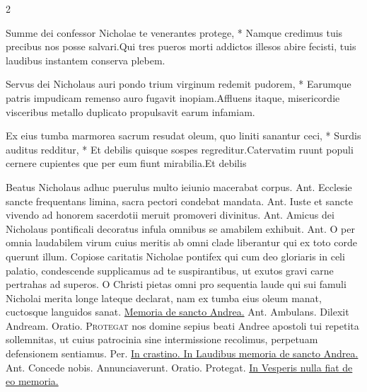 \begin{multicols*}{2}
\begin{responsory}
{Summe dei confessor Nicholae te venerantes protege, * Namque credimus tuis precibus nos posse salvari.}{Qui tres pueros morti addictos illesos abire fecisti, tuis laudibus instantem conserva plebem.}
\end{responsory}%
\begin{responsory}
{Servus dei Nicholaus auri pondo trium virginum redemit pudorem, * Earumque patris impudicam remenso auro fugavit inopiam.}{Affluens itaque, misericordie visceribus metallo duplicato propulsavit earum infamiam.}
\end{responsory}%
\begin{responsory-final}
{Ex eius tumba marmorea sacrum resudat oleum, quo liniti sanantur ceci, * Surdis auditus redditur, * Et debilis quisque sospes regreditur.}{Catervatim ruunt populi cernere cupientes que per eum fiunt mirabilia.}{Et debilis}%
\end{responsory-final}%
 Beatus Nicholaus adhuc puerulus multo ieiunio macerabat corpus. {\color{Red} Ant.} Ecclesie sancte frequentans limina, sacra pectori condebat mandata. {\color{Red} Ant.} Iuste et sancte vivendo ad honorem sacerdotii meruit promoveri divinitus. {\color{Red} Ant.} Amicus dei Nicholaus pontificali decoratus infula omnibus se amabilem exhibuit. {\color{Red} Ant.} O per omnia laudabilem virum cuius meritis ab omni clade liberantur qui ex toto corde querunt illum.
 Copiose caritatis Nicholae pontifex qui cum deo gloriaris in celi palatio, condescende supplicamus ad te suspirantibus, ut exutos gravi carne pertrahas ad superos.
 O Christi pietas omni pro sequentia laude qui sui famuli Nicholai merita longe lateque declarat, nam ex tumba eius oleum manat, cuctosque languidos sanat.
\newline \ul{Memoria de sancto Andrea.} {\color{Red} Ant.} Ambulans. \V Dilexit Andream. {\color{Red} Oratio.}
\lettrine[lines=2]{\zallmancaps \color{Red} P}{rotegat} nos domine sepius beati Andree apostoli tui repetita sollemnitas, ut cuius patrocinia sine intermissione recolimus, perpetuam defensionem sentiamus. Per.
\newline \ul{In crastino. In Laudibus memoria de sancto Andrea.} {\color{Red} Ant.} Concede nobis. \V Annunciaverunt. {\color{Red} Oratio.} Protegat. \ul{In Vesperis nulla fiat de eo memoria.}

\end{multicols*}
